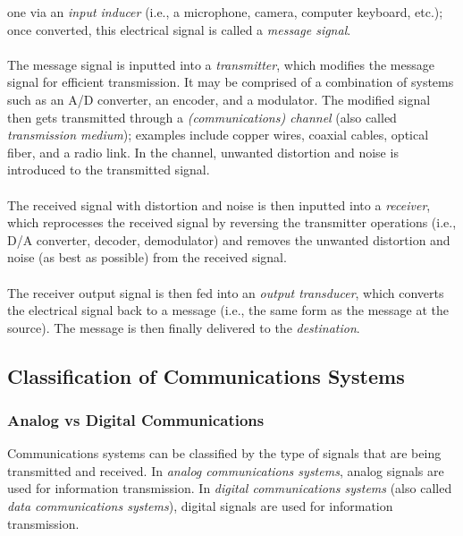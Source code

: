 \documentclass{report}
\begin{document}
one via an \emph{input inducer} (i.e., a microphone, camera, computer keyboard, etc.); once converted, this electrical signal is called a \emph{message signal}. 
\\ \\
The message signal is inputted into a \emph{transmitter}, which modifies the message signal for efficient transmission. It may be comprised of a combination of systems such as an A/D converter, an encoder, 
and a modulator. The modified signal then gets transmitted through a \emph{(communications) channel} (also called \emph{transmission medium}); examples include copper wires, coaxial cables, optical fiber, 
and a radio link. In the channel, unwanted distortion and noise is introduced to the transmitted signal.
\\ \\ 
The received signal with distortion and noise is then inputted into a \emph{receiver}, which reprocesses the received signal by reversing the transmitter operations (i.e., D/A converter, decoder, demodulator) 
and removes the unwanted distortion and noise (as best as possible) from the received signal.
\\ \\
The receiver output signal is then fed into an \emph{output transducer}, which converts the electrical signal back to a message (i.e., the same form as the message at the source). The message is then finally 
delivered to the \emph{destination}.

\subsection{Classification of Communications Systems}

\subsubsection{Analog vs Digital Communications}
Communications systems can be classified by the type of signals that are being transmitted and received. In \emph{analog communications systems}, analog signals 
are used for information transmission. In \emph{digital communications systems} (also called \emph{data communications systems}), digital signals are used for 
information transmission.
\end{document}
